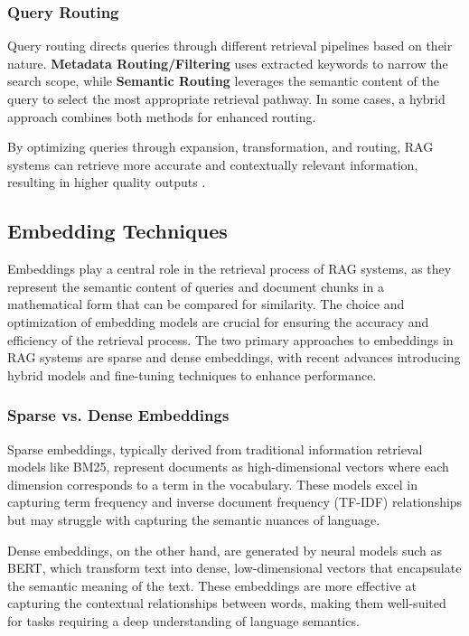 \subsubsection{Query Routing}

Query routing directs queries through different retrieval pipelines based on their nature. \textbf{Metadata Routing/Filtering} uses extracted keywords to narrow the search scope, while \textbf{Semantic Routing} leverages the semantic content of the query to select the most appropriate retrieval pathway. In some cases, a hybrid approach combines both methods for enhanced routing.

By optimizing queries through expansion, transformation, and routing, RAG systems can retrieve more accurate and contextually relevant information, resulting in higher quality outputs \cite{gao2023retrieval}.

\subsection{Embedding Techniques}

Embeddings play a central role in the retrieval process of RAG systems, as they represent the semantic content of queries and document chunks in a mathematical form that can be compared for similarity. The choice and optimization of embedding models are crucial for ensuring the accuracy and efficiency of the retrieval process. The two primary approaches to embeddings in RAG systems are sparse and dense embeddings, with recent advances introducing hybrid models and fine-tuning techniques to enhance performance.

\subsubsection{Sparse vs. Dense Embeddings}

Sparse embeddings, typically derived from traditional information retrieval models like BM25, represent documents as high-dimensional vectors where each dimension corresponds to a term in the vocabulary. These models excel in capturing term frequency and inverse document frequency (TF-IDF) relationships but may struggle with capturing the semantic nuances of language.

Dense embeddings, on the other hand, are generated by neural models such as BERT, which transform text into dense, low-dimensional vectors that encapsulate the semantic meaning of the text. These embeddings are more effective at capturing the contextual relationships between words, making them well-suited for tasks requiring a deep understanding of language semantics.

